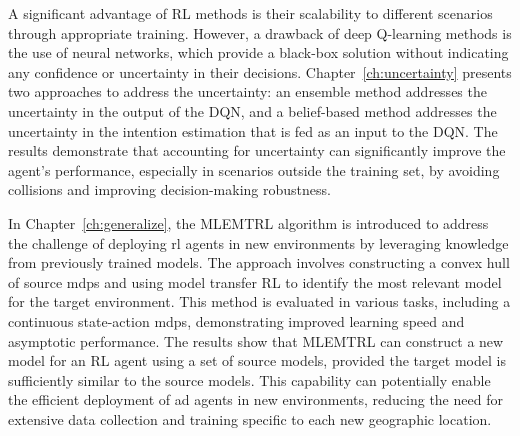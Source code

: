 A significant advantage of RL methods is their scalability to different scenarios through appropriate training. However, a drawback of deep Q-learning methods is the use of neural networks, which provide a black-box solution without indicating any confidence or uncertainty in their decisions. Chapter~\ref{ch:uncertainty} presents two approaches to address the uncertainty: an ensemble method addresses the uncertainty in the output of the DQN, and a belief-based method addresses the uncertainty in the intention estimation that is fed as an input to the DQN. The results demonstrate that accounting for uncertainty can significantly improve the agent's performance, especially in scenarios outside the training set, by avoiding collisions and improving decision-making robustness.

In Chapter~\ref{ch:generalize}, the MLEMTRL algorithm is introduced to address the challenge of deploying \gls{rl} agents in new environments by leveraging knowledge from previously trained models. The approach involves constructing a convex hull of source \gls{mdp}s and using model transfer RL to identify the most relevant model for the target environment. This method is evaluated in various tasks, including a continuous state-action \gls{mdp}s, demonstrating improved learning speed and asymptotic performance.
The results show that MLEMTRL can construct a new model for an RL agent using a set of source models, provided the target model is sufficiently similar to the source models. This capability can potentially enable the efficient deployment of \gls{ad} agents in new environments, reducing the need for extensive data collection and training specific to each new geographic location.

